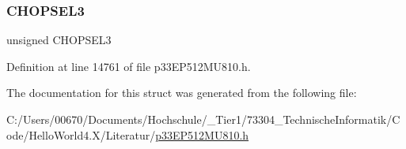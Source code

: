 \subsubsection{\texorpdfstring{C\+H\+O\+P\+S\+E\+L3}{CHOPSEL3}}
{\footnotesize\ttfamily unsigned C\+H\+O\+P\+S\+E\+L3}



Definition at line 14761 of file p33\+E\+P512\+M\+U810.\+h.



The documentation for this struct was generated from the following file\+:\begin{DoxyCompactItemize}
\item 
C\+:/\+Users/00670/\+Documents/\+Hochschule/\+\_\+\+Tier1/73304\+\_\+\+Technische\+Informatik/\+Code/\+Hello\+World4.\+X/\+Literatur/\hyperlink{p33_e_p512_m_u810_8h}{p33\+E\+P512\+M\+U810.\+h}\end{DoxyCompactItemize}
